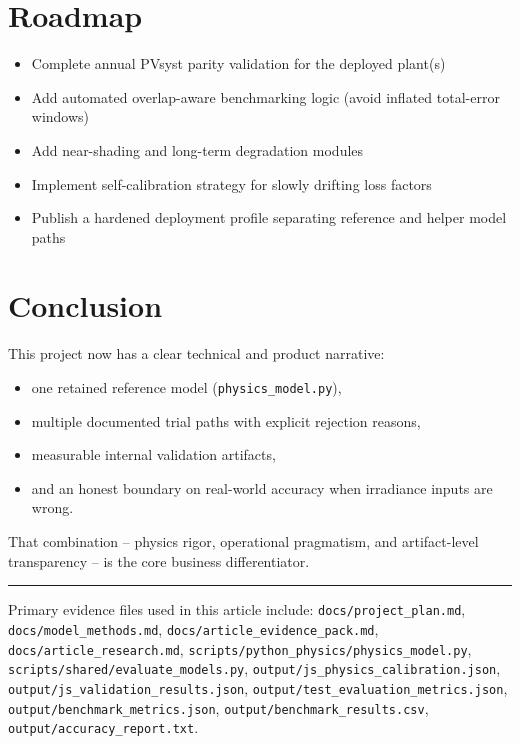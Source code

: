 \documentclass[11pt,a4paper]{article}
\newcommand{\artifact}[1]{\texttt{#1}}
\begin{document}
\section{Roadmap}

\begin{itemize}
  \item Complete annual PVsyst parity validation for the deployed plant(s)
  \item Add automated overlap-aware benchmarking logic (avoid inflated total-error windows)
  \item Add near-shading and long-term degradation modules
  \item Implement self-calibration strategy for slowly drifting loss factors
  \item Publish a hardened deployment profile separating reference and helper model paths
\end{itemize}

\section{Conclusion}

This project now has a clear technical and product narrative:
\begin{itemize}
  \item one retained reference model (\artifact{physics\_model.py}),
  \item multiple documented trial paths with explicit rejection reasons,
  \item measurable internal validation artifacts,
  \item and an honest boundary on real-world accuracy when irradiance inputs are wrong.
\end{itemize}

That combination -- physics rigor, operational pragmatism, and artifact-level transparency -- is the core business differentiator.

\vspace{0.6em}
\noindent\rule{\linewidth}{0.4pt}
{\small\color{textmuted}
Primary evidence files used in this article include:
\artifact{docs/project\_plan.md},
\artifact{docs/model\_methods.md},
\artifact{docs/article\_evidence\_pack.md},
\artifact{docs/article\_research.md},
\artifact{scripts/python\_physics/physics\_model.py},
\artifact{scripts/shared/evaluate\_models.py},
\artifact{output/js\_physics\_calibration.json},
\artifact{output/js\_validation\_results.json},
\artifact{output/test\_evaluation\_metrics.json},
\artifact{output/benchmark\_metrics.json},
\artifact{output/benchmark\_results.csv},
\artifact{output/accuracy\_report.txt}.}

\newpage
\printbibliography[title={References}]
\end{document}
